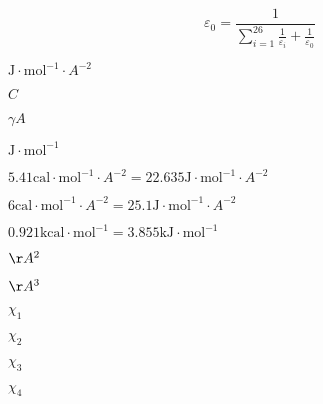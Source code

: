 \documentclass{article}
\begin{document}
\[ \varepsilon_0 = \frac{1}{\sum_{i=1}^{26} \frac{1}{\varepsilon_i} + \frac{1}{\varepsilon_0}} \]
\pagebreak

$\mathrm{J}\cdot\mathrm{mol}^{-1}\cdot A^{-2}$
\pagebreak

$C$
\pagebreak

$\gamma A$
\pagebreak

$\mathrm{J}\cdot\mathrm{mol}^{-1}$
\pagebreak

$5.41 \mathrm{cal}\cdot\mathrm{mol}^{-1}\cdot A^{-2} = 22.635 \mathrm{J}\cdot\mathrm{mol}^{-1}\cdot A^{-2}$
\pagebreak

$6 \mathrm{cal}\cdot\mathrm{mol}^{-1}\cdot A^{-2} = 25.1 \mathrm{J}\cdot\mathrm{mol}^{-1}\cdot A^{-2}$
\pagebreak

$0.921 \mathrm{kcal}\cdot\mathrm{mol}^{-1} = 3.855 \mathrm{kJ}\cdot\mathrm{mol}^{-1}$
\pagebreak

$\AA^2$
\pagebreak

$\AA^3$
\pagebreak

$\chi_1$
\pagebreak

$\chi_2$
\pagebreak

$\chi_3$
\pagebreak

$\chi_4$
\pagebreak
\end{document}
